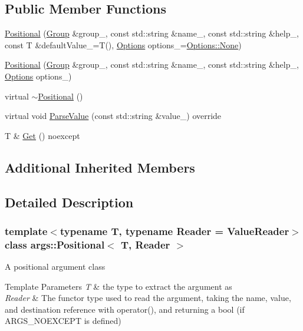 \subsection*{Public Member Functions}
\begin{DoxyCompactItemize}
\item 
\hyperlink{classargs_1_1_positional_ab28805fe2f9364bf9fb2e5f5acf3236d}{Positional} (\hyperlink{classargs_1_1_group}{Group} \&group\+\_\+, const std\+::string \&name\+\_\+, const std\+::string \&help\+\_\+, const T \&default\+Value\+\_\+=T(), \hyperlink{namespaceargs_aa530c0f95194aa275f49a5f299ac9e77}{Options} options\+\_\+=\hyperlink{namespaceargs_aa530c0f95194aa275f49a5f299ac9e77a6adf97f83acf6453d4a6a4b1070f3754}{Options\+::\+None})
\item 
\hyperlink{classargs_1_1_positional_a72a7d74c1578cbc6d7ec0d654a0b001a}{Positional} (\hyperlink{classargs_1_1_group}{Group} \&group\+\_\+, const std\+::string \&name\+\_\+, const std\+::string \&help\+\_\+, \hyperlink{namespaceargs_aa530c0f95194aa275f49a5f299ac9e77}{Options} options\+\_\+)
\item 
virtual \hyperlink{classargs_1_1_positional_a7bf17b3ebdd71316d365df1b225d01d5}{$\sim$\+Positional} ()
\item 
virtual void \hyperlink{classargs_1_1_positional_a2ae24a17caca2e02b95f0977783fc65d}{Parse\+Value} (const std\+::string \&value\+\_\+) override
\item 
T \& \hyperlink{classargs_1_1_positional_ad96c622414ac070fe2ac95363ee1810a}{Get} () noexcept
\end{DoxyCompactItemize}
\subsection*{Additional Inherited Members}


\subsection{Detailed Description}
\subsubsection*{template$<$typename T, typename Reader = Value\+Reader$>$\newline
class args\+::\+Positional$<$ T, Reader $>$}

A positional argument class


\begin{DoxyTemplParams}{Template Parameters}
{\em T} & the type to extract the argument as \\
\hline
{\em Reader} & The functor type used to read the argument, taking the name, value, and destination reference with operator(), and returning a bool (if A\+R\+G\+S\+\_\+\+N\+O\+E\+X\+C\+E\+PT is defined) \\
\hline
\end{DoxyTemplParams}



